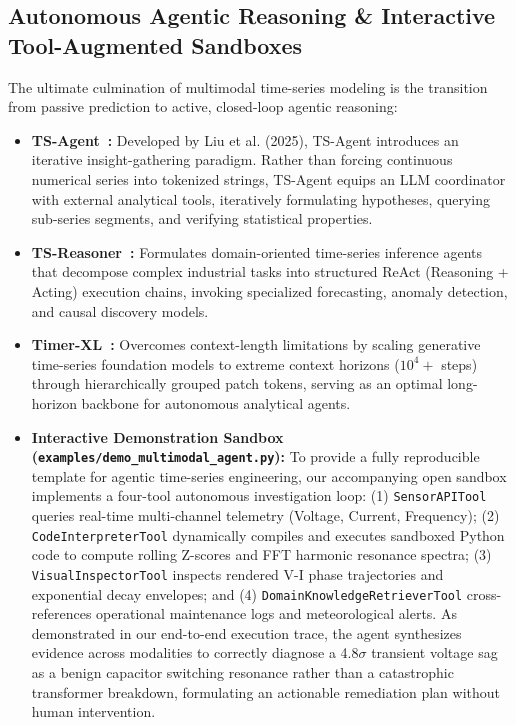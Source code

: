\subsection{Autonomous Agentic Reasoning \& Interactive Tool-Augmented Sandboxes}
\label{sec:agentic_sandboxes}
The ultimate culmination of multimodal time-series modeling is the transition from passive prediction to active, closed-loop agentic reasoning:
\begin{itemize}
    \item \textbf{TS-Agent~\cite{Liu2025TSAgent}:} Developed by Liu et al. (2025), TS-Agent introduces an iterative insight-gathering paradigm. Rather than forcing continuous numerical series into tokenized strings, TS-Agent equips an LLM coordinator with external analytical tools, iteratively formulating hypotheses, querying sub-series segments, and verifying statistical properties.
    \item \textbf{TS-Reasoner~\cite{Ye2024TSReasoner}:} Formulates domain-oriented time-series inference agents that decompose complex industrial tasks into structured ReAct (Reasoning + Acting) execution chains, invoking specialized forecasting, anomaly detection, and causal discovery models.
    \item \textbf{Timer-XL~\cite{Liu2024TimerXL}:} Overcomes context-length limitations by scaling generative time-series foundation models to extreme context horizons ($10^4+$ steps) through hierarchically grouped patch tokens, serving as an optimal long-horizon backbone for autonomous analytical agents.
    \item \textbf{Interactive Demonstration Sandbox (\texttt{examples/demo\_multimodal\_agent.py}):} To provide a fully reproducible template for agentic time-series engineering, our accompanying open sandbox implements a four-tool autonomous investigation loop:
    (1) \texttt{SensorAPITool} queries real-time multi-channel telemetry (Voltage, Current, Frequency);
    (2) \texttt{CodeInterpreterTool} dynamically compiles and executes sandboxed Python code to compute rolling Z-scores and FFT harmonic resonance spectra;
    (3) \texttt{VisualInspectorTool} inspects rendered V-I phase trajectories and exponential decay envelopes; and
    (4) \texttt{DomainKnowledgeRetrieverTool} cross-references operational maintenance logs and meteorological alerts.
    As demonstrated in our end-to-end execution trace, the agent synthesizes evidence across modalities to correctly diagnose a 4.8$\sigma$ transient voltage sag as a benign capacitor switching resonance rather than a catastrophic transformer breakdown, formulating an actionable remediation plan without human intervention.
\end{itemize}

